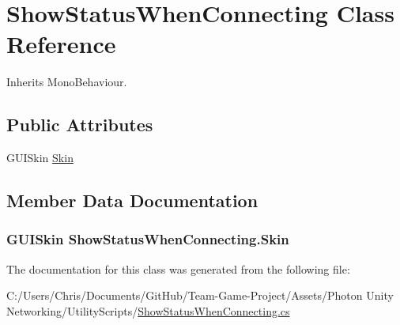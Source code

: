 \hypertarget{class_show_status_when_connecting}{}\section{Show\+Status\+When\+Connecting Class Reference}
\label{class_show_status_when_connecting}


Inherits Mono\+Behaviour.

\subsection*{Public Attributes}
\begin{DoxyCompactItemize}
\item 
G\+U\+I\+Skin \hyperlink{class_show_status_when_connecting_a8e289890414197e62154adeae8d2d679}{Skin}
\end{DoxyCompactItemize}


\subsection{Member Data Documentation}
\subsubsection[{\texorpdfstring{Skin}{Skin}}]{\setlength{\rightskip}{0pt plus 5cm}G\+U\+I\+Skin Show\+Status\+When\+Connecting.\+Skin}\hypertarget{class_show_status_when_connecting_a8e289890414197e62154adeae8d2d679}{}\label{class_show_status_when_connecting_a8e289890414197e62154adeae8d2d679}


The documentation for this class was generated from the following file\+:\begin{DoxyCompactItemize}
\item 
C\+:/\+Users/\+Chris/\+Documents/\+Git\+Hub/\+Team-\/\+Game-\/\+Project/\+Assets/\+Photon Unity Networking/\+Utility\+Scripts/\hyperlink{_show_status_when_connecting_8cs}{Show\+Status\+When\+Connecting.\+cs}\end{DoxyCompactItemize}

